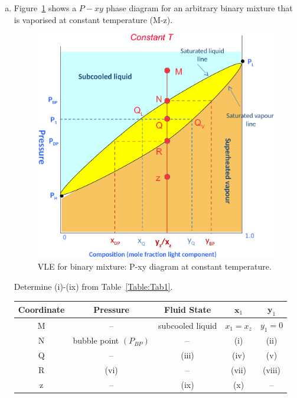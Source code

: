 \documentclass[calculator,allquestions,datasheet,mock,solutions]{exam_newMarcus2}
\begin{document}
\begin{question}
  \begin{enumerate}[a)]
    \item Figure~\ref{Figure:Fig1} shows a $P-xy$ phase diagram for an arbitrary binary mixture that is vaporised at constant temperature (M-z).
      \begin{figure}[h]
        \begin{center}
          \includegraphics[width=.5\linewidth,clip]{./Pics/VLE_Pxy_Diagram3b}
          \caption{VLE for binary mixture: P-xy diagram at constant temperature.}\label{Figure:Fig1}
        \end{center}
      \end{figure}
      Determine (i)-(ix) from Table~\ref{Table:Tab1}.
      \begin{table}[h]
        \begin{center}
          \begin{tabular}{||c| c | c | c | c ||}
            \hline\hline
            {\bf Coordinate} & {\bf Pressure} & {\bf Fluid State} & $\mathbf{x}_{1}$ & $\mathbf{y}_{1}$ \\
            \hline
                 M           &   --           &   subcooled liquid & $x_{1}=x_{z}$    & $y_{1}=0$        \\
                 N           &bubble point $\left(P_{BP}\right)$&--& (i)             & (ii)            \\
                 Q           &  --            &     (iii)          & (iv)             & (v)            \\
                 R           &  (vi)          &     --             & (vii)             & (viii)            \\
                 z           &  --           &     (ix)            & (x)         &  --            \\                 
            \hline\hline

\end{tabular}
\end{center}
\end{table}
\end{enumerate}
\end{question}
\end{document}
